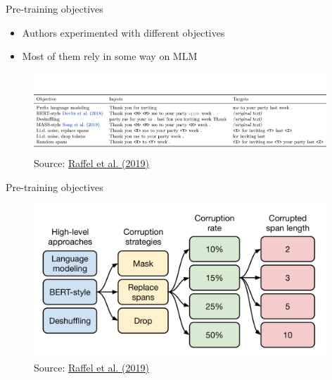 
\begin{frame}{Pre-training objectives}

\vfill

	\begin{itemize}
		\item Authors experimented with different objectives
		\item Most of them rely in some way on MLM
	\end{itemize}
	
	\begin{figure}
		\centering
		\includegraphics[width = 11cm]{figure/63-t5-objectives1.png}\\ 
		\footnotesize{Source:} \href{https://arxiv.org/pdf/1910.10683.pdf}{\footnotesize Raffel et al. (2019)}
	\end{figure}
	
\vfill

\end{frame}


\begin{frame}{Pre-training objectives}

\vfill

	\begin{figure}
		\centering
		\includegraphics[width = 11cm]{figure/63-t5-objectives2.png}\\ 
		\footnotesize{Source:} \href{https://arxiv.org/pdf/1910.10683.pdf}{\footnotesize Raffel et al. (2019)}
	\end{figure}
	
\vfill

\end{frame}

